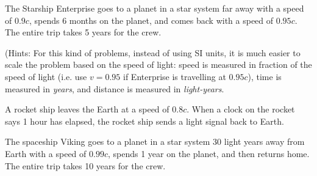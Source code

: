 \documentclass{../../../oss-ap12ibhl}
\begin{document}
\begin{questions}
  \question The Starship Enterprise goes to a planet in a star system far away
  with a speed of $0.9c$, spends 6 months on the planet, and comes back with a
  speed of $0.95c$. The entire trip takes 5 years for the crew.
  (Hints: For this kind of problems, instead of using SI units, it is much
  easier to scale the problem based on the speed of light: speed is measured in
  fraction of the speed of light (i.e. use $v=0.95$ if Enterprise is travelling
  at $0.95c$), time is measured in \emph{years}, and distance is measured in
  \emph{light-years}.
  
  \question A rocket ship leaves the Earth at a speed of $0.8c$. When a clock
  on the rocket says 1 hour has elapsed, the rocket ship sends a light signal
  back to Earth.

  \question The spaceship Viking goes to a planet in a star system 30 light
  years away from Earth with a speed of $0.99c$, spends 1 year on the planet,
  and then returns home. The entire trip takes 10 years for the crew.
  \begin{parts}

\end{parts}
\end{questions}
\end{document}

